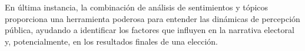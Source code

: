 \documentclass[10pt, a4paper]{article}
\begin{document}
	En última instancia, la combinación de análisis de sentimientos y tópicos proporciona una herramienta poderosa para entender las dinámicas de percepción pública, ayudando a identificar los factores que influyen en la narrativa electoral y, potencialmente, en los resultados finales de una elección.
	
	
	
	
	\newpage
	\printbibliography
	
	
	
\end{document}
